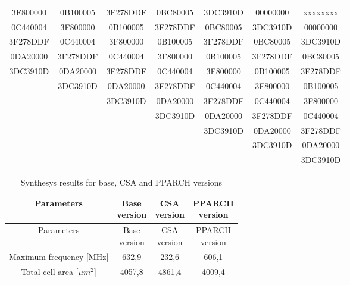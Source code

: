 \documentclass[a4paper, titlepage]{article}
\begin{document}
\begin{longtable}{*7c}
3F800000 & 0B100005 & 3F278DDF & 0BC80005 & 3DC3910D & 00000000 & xxxxxxxx\\
0C440004 & 3F800000 & 0B100005 & 3F278DDF & 0BC80005 & 3DC3910D & 00000000\\
3F278DDF & 0C440004 & 3F800000 & 0B100005 & 3F278DDF & 0BC80005 & 3DC3910D\\
0DA20000 & 3F278DDF & 0C440004 & 3F800000 & 0B100005 & 3F278DDF & 0BC80005\\
3DC3910D & 0DA20000 & 3F278DDF & 0C440004 & 3F800000 & 0B100005 & 3F278DDF\\
 & 3DC3910D & 0DA20000 & 3F278DDF & 0C440004 & 3F800000 & 0B100005\\
 &  & 3DC3910D & 0DA20000 & 3F278DDF & 0C440004 & 3F800000\\
 &  &  & 3DC3910D & 0DA20000 & 3F278DDF & 0C440004\\
 &  &  &  & 3DC3910D & 0DA20000 & 3F278DDF\\
 &  &  &  &  & 3DC3910D & 0DA20000\\
 &  &  &  &  &  & 3DC3910D\\
\end{longtable}

\begin{longtable}{*4c}
\caption{Synthesys results for base, CSA and PPARCH versions}
\label{tab:synthesys mult}\\
\toprule
 Parameters&\thead{Base\\version} & \thead{CSA\\version} & \thead{PPARCH\\version}\\
\midrule
\endfirsthead
Parameters& \thead{Base\\version} & \thead{CSA\\version} & \thead{PPARCH\\version}\\
\midrule
\endhead
\midrule
\endfoot
\bottomrule
\endlastfoot
Maximum frequency [MHz] & 632,9 & 232,6 & 606,1 \\
Total cell area [$\mu m^2$] &  4057,8 & 4861,4 & 4009,4 \\
\end{longtable}
\end{document}
